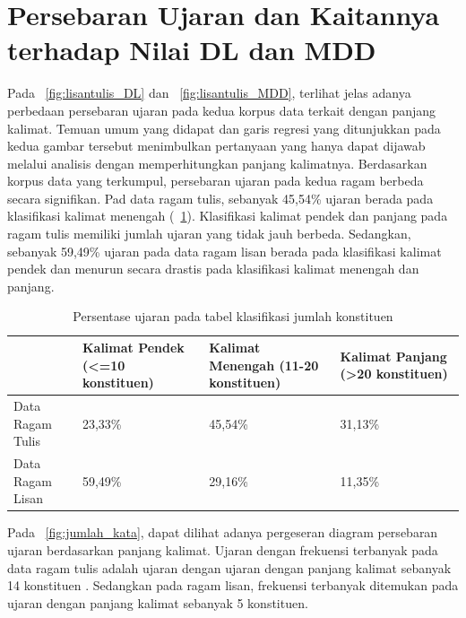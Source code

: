 \section{Persebaran Ujaran dan Kaitannya terhadap Nilai DL dan MDD}
Pada \pic~\ref{fig:lisantulis_DL}  dan \pic~\ref{fig:lisantulis_MDD}, terlihat jelas adanya perbedaan persebaran ujaran pada kedua korpus data terkait dengan panjang kalimat. Temuan umum yang didapat dan garis regresi yang ditunjukkan pada kedua gambar tersebut menimbulkan pertanyaan yang hanya dapat dijawab melalui analisis dengan memperhitungkan panjang kalimatnya. Berdasarkan korpus data yang terkumpul, persebaran ujaran pada kedua ragam berbeda secara signifikan. Pad data ragam tulis, sebanyak 45,54\% ujaran berada pada klasifikasi kalimat menengah (\tab~\ref{tab:presentase_ujaran}). Klasifikasi kalimat pendek dan panjang pada ragam tulis memiliki jumlah ujaran yang tidak jauh berbeda. Sedangkan, sebanyak 59,49\% ujaran pada data ragam lisan berada pada klasifikasi kalimat pendek dan menurun secara drastis pada klasifikasi kalimat menengah dan panjang.

\begin{table}
\begin{center}
\begin{small}
   \caption{Persentase ujaran pada tabel klasifikasi jumlah konstituen}  \label{tab:presentase_ujaran}
  \begin{tabular}{ |p{3cm} | p{3cm} | p{3cm} | p{3cm} |}
    \hline
 & Kalimat Pendek \newline (\textless=10 konstituen) & Kalimat Menengah (11-20 konstituen) & Kalimat Panjang (\textgreater20 konstituen) \\ \hline
Data Ragam Tulis & 23,33\% & 45,54\% & 31,13\% \\ \hline
Data Ragam Lisan & 59,49\% & 29,16\% & 11,35\% \\ \hline
  \end{tabular}
  \end{small}
\end{center}
\end{table}


Pada \pic~\ref{fig:jumlah_kata}, dapat dilihat adanya pergeseran diagram persebaran ujaran berdasarkan panjang kalimat. Ujaran dengan frekuensi terbanyak pada data ragam tulis adalah ujaran dengan ujaran dengan panjang kalimat sebanyak 14 konstituen . Sedangkan pada ragam lisan, frekuensi terbanyak ditemukan pada ujaran dengan panjang kalimat sebanyak 5 konstituen. 

